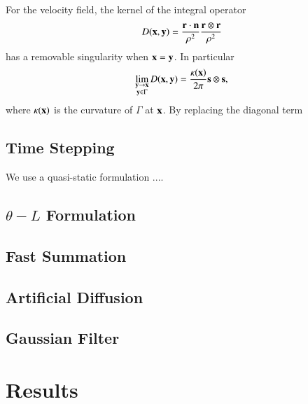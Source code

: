 \documentclass[preprint, 10pt]{elsarticle}
\begin{document}
For the velocity field, the kernel of the integral operator
\begin{align}
  D({\mathbf{x}},{\mathbf{y}}) = \frac{{\mathbf{r}} \cdot {\mathbf{n}}}{\rho^2} 
               \frac{{\mathbf{r}} \otimes {\mathbf{r}}}{\rho^2}
\end{align}
has a removable singularity when ${\mathbf{x}} = {\mathbf{y}}$.  In particular
\begin{align}
  \lim_{\substack{{\mathbf{y}} \rightarrow {\mathbf{x}} \\ {\mathbf{y}} \in \Gamma}} D({\mathbf{x}},{\mathbf{y}}) = 
  \frac{\kappa({\mathbf{x}})}{2\pi}{\mathbf{s}} \otimes {\mathbf{s}},
\end{align}
where $\kappa({\mathbf{x}})$ is the curvature of $\Gamma$ at ${\mathbf{x}}$.  By replacing
the diagonal term 

\subsection{Time Stepping} 
We use a quasi-static formulation ....

\subsection{$\theta-L$ Formulation} 


\subsection{Fast Summation} 

\subsection{Artificial Diffusion} 

\subsection{Gaussian Filter} 

\section{Results\label{s:results}} 

\end{document}
